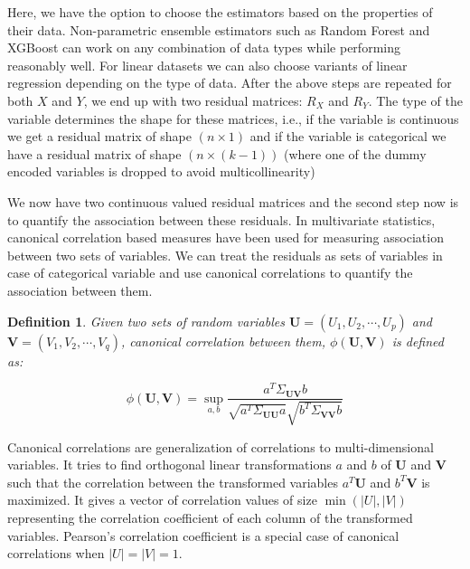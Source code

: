\documentclass[letterpaper]{article} %
\newtheorem{definition}{Definition}
\begin{document}

Here, we have the option to choose the estimators based on the properties of
their data. Non-parametric ensemble estimators such as Random Forest and
XGBoost can work on any combination of data types while performing reasonably
well. For linear datasets we can also choose variants of linear regression
depending on the type of data. After the above steps are repeated for both $ X
$ and $ Y $, we end up with two residual matrices: $ R_X $ and $ R_Y $. The
type of the variable determines the shape for these matrices, i.e., if the
variable is continuous we get a residual matrix of shape $ ( n \times 1 ) $ and
if the variable is categorical we have a residual matrix of shape $ ( n \times
(k-1)) $ (where one of the dummy encoded variables is dropped to avoid
multicollinearity)

We now have two continuous valued residual matrices and the second step now is
to quantify the association between these residuals. In multivariate
statistics, canonical correlation based measures have been used for measuring
association between two sets of variables. We can treat the residuals as sets
of variables in case of categorical variable and use canonical correlations to
quantify the association between them.

\begin{definition}
	Given two sets of random variables $ \bm{U} = (U_1, U_2, \cdots, U_p) $
	and $ \bm{V} = (V_1, V_2, \cdots, V_q) $, canonical correlation between
	them, $\phi(\bm{U}, \bm{V}) $ is defined as:
		
	\begin{equation}
		\phi(\bm{U}, \bm{V}) = \sup_{a, b} \frac{a^T \Sigma_{\bm{U}\bm{V}} b}{\sqrt{a^T \Sigma_{\bm{U}\bm{U}} a} \sqrt{b^T \Sigma_{\bm{V}\bm{V}} b}}
	\end{equation}

\end{definition}
	
Canonical correlations are generalization of correlations to multi-dimensional
variables. It tries to find orthogonal linear transformations $ a $ and $ b $
of $ \bm{U} $ and $ \bm{V} $ such that the correlation between the transformed
variables $ a^T \bm{U} $ and $ b^T \bm{V} $ is maximized. It gives a vector of
correlation values of size $ \min(\rvert U \rvert, \rvert V \rvert) $
representing the correlation coefficient of each column of the transformed
variables. Pearson's correlation coefficient is a special case of canonical
correlations when $ \rvert U \rvert = \rvert V \rvert = 1$.
\end{document}
